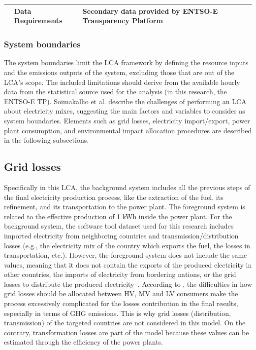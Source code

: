 {\begin{table}[htbp]
{\begin{tabular}{lll}
                                \\ \cline{2-3} 
                                & \textbf{Data Requirements}         & Secondary data provided by ENTSO-E Transparency Platform                                                                                                                   \\ \bottomrule
  \end{tabular}                              
\label{screeninglca}
}
\end{table}


\subsubsection{System boundaries} \label{SB}
The system boundaries limit the LCA framework by defining the resource inputs and the emissions outputs of the system, excluding those that are out of the LCA's scope. The included limitations should derive from the available hourly data from the statistical source used for the analysis (in this research, the ENTSO-E TP). Soimakallio et al. \cite{Soimakallio2011} describe the challenges of performing an LCA about electricity mixes, suggesting the main factors and variables to consider as system boundaries. Elements such as grid losses, electricity import/export, power plant consumption, and environmental impact allocation procedures are described in the following subsections. 

\subsection*{Grid losses} 
Specifically in this LCA, the background system includes all the previous steps of the final electricity production process, like the extraction of the fuel, its refinement, and its transportation to the power plant. The foreground system is related to the effective production of 1 kWh inside the power plant. For the background system, the software tool dataset used for this research includes imported electricity from neighboring countries and transmission/distribution losses (e.g., the electricity mix of the country which exports the fuel, the losses in transportation, etc.). However, the foreground system does not include the same values, meaning that it does not contain the exports of the produced electricity in other countries, the imports of electricity from bordering nations, or the grid losses to distribute the produced electricity~\cite{PEInternational2014GaBiV6}. According to \cite{Soimakallio2011}, the difficulties in how  grid losses should be allocated between HV, MV and LV consumers make the process excessively complicated for the losses contribution in the final results, especially in terms of GHG emissions. This is why grid losses (distribution, transmission) of the targeted countries are not considered in this model. On the contrary, transformation losses are part of the model because these values can be estimated through the efficiency of the power plants. 

}
